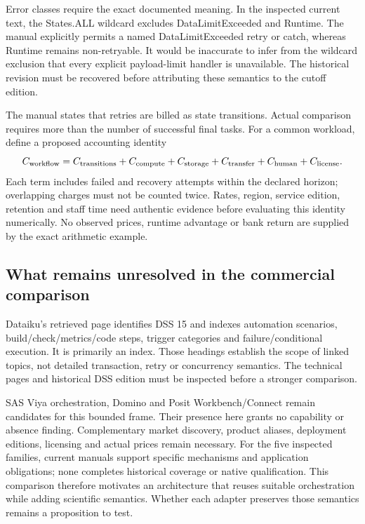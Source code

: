 Error classes require the exact documented meaning. In the inspected current
text, the States.ALL wildcard excludes DataLimitExceeded and Runtime. The
manual explicitly permits a named DataLimitExceeded retry or catch, whereas
Runtime remains non-retryable. It would be inaccurate to infer from the
wildcard exclusion that every explicit payload-limit handler is unavailable.
The historical revision must be recovered before attributing these semantics
to the cutoff edition.\citep{exec22_workflow_aws_errors}

The manual states that retries are billed as state transitions. Actual
comparison requires more than the number of successful final tasks. For a
common workload, define a proposed accounting identity
\begin{equation}
 C_{\rm workflow}=C_{\rm transitions}+C_{\rm compute}+C_{\rm storage}
                  +C_{\rm transfer}+C_{\rm human}+C_{\rm license}.
 \label{exec22:workflow-cost}
\end{equation}
Each term includes failed and recovery attempts within the declared horizon;
overlapping charges must not be counted twice. Rates, region, service edition,
retention and staff time need authentic evidence before evaluating this
identity numerically. No observed prices, runtime advantage or bank return
are supplied by the exact arithmetic example.

\subsection{What remains unresolved in the commercial comparison}

Dataiku's retrieved page identifies DSS 15 and indexes automation scenarios,
build/check/metrics/code steps, trigger categories and failure/conditional
execution. It is primarily an index. Those headings establish the scope of
linked topics, not detailed transaction, retry or concurrency semantics.
The technical pages and historical DSS edition must be inspected before a
stronger comparison.\citep{exec22_workflow_dataiku_scenarios}

SAS Viya orchestration, Domino and Posit Workbench/Connect remain candidates
for this bounded frame. Their presence here grants no capability or absence
finding. Complementary market discovery, product aliases, deployment editions,
licensing and actual prices remain necessary. For the five inspected families,
current manuals support specific mechanisms and application obligations;
none completes historical coverage or native qualification. This comparison
therefore motivates an architecture that reuses suitable orchestration while
adding scientific semantics. Whether each adapter preserves those semantics
remains a proposition to test.

